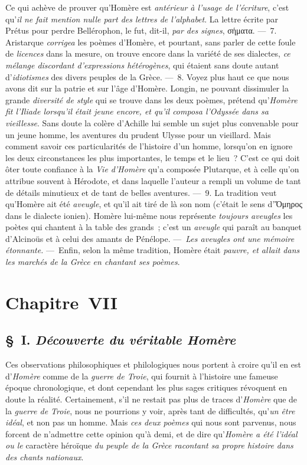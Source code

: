 \documentclass[french,twoside]{book} %
\newcommand\chapteropen{} %
\newcommand\chaptercont{} %
\newcommand\chapterclose{} %
\begin{document}
Ce qui achève de prouver qu’Homère est {\itshape antérieur à l’usage de l’écriture}, c’est qu’{\itshape il ne fait mention nulle part des lettres de l’alphabet}. La lettre écrite par Prétus pour perdre Bellérophon, le fut, dit-il, {\itshape par des signes}, σήματα. — 7. Aristarque {\itshape corrigea} les poèmes d’Homère, et pourtant, sans parler de  cette foule de {\itshape licences} dans la mesure, on trouve encore dans la variété de ses dialectes, {\itshape ce mélange discordant d’expressions hétérogènes}, qui étaient sans doute autant d’{\itshape idiotismes} des divers peuples de la Grèce. — 8. Voyez plus haut ce que nous avons dit sur la patrie et sur l’âge d’Homère. Longin, ne pouvant dissimuler la grande {\itshape diversité de style} qui se trouve dans les deux poèmes, prétend qu’{\itshape Homère fit l’Iliade lorsqu’il était jeune encore, et qu’il composa l’Odyssée dans sa vieillesse}. Sans doute la colère d’Achille lui semble un sujet plus convenable pour un jeune homme, les aventures du prudent Ulysse pour un vieillard. Mais comment savoir ces particularités de l’histoire d’un homme, lorsqu’on en ignore les deux circonstances les plus importantes, le temps et le lieu ? C’est ce qui doit ôter toute confiance à la {\itshape Vie d’Homère} qu’a composée Plutarque, et à celle qu’on attribue souvent à Hérodote, et dans laquelle l’auteur a rempli un volume de tant de détails minutieux et de tant de belles aventures. — 9. La tradition veut qu’Homère ait été {\itshape aveugle}, et qu’il ait tiré de là son nom (c’était le sens d’Ὅμηρος dans le dialecte ionien). Homère lui-même nous représente {\itshape toujours aveugles} les poètes qui chantent à la table des grands ; c’est un {\itshape aveugle} qui paraît au banquet d’Alcinoüs et à celui des amants de Pénélope. — {\itshape Les aveugles ont une mémoire étonnante.} — Enfin, selon la même tradition, Homère était {\itshape pauvre, et allait dans les marchés de la Grèce en chantant ses poèmes}.
\chapterclose


\chapteropen
\chapter[{Chapitre VII}]{Chapitre VII}

\chaptercont
\section[{§ I. Découverte du véritable Homère}]{§ I. {\itshape Découverte du véritable Homère}}
\noindent  Ces observations philosophiques et philologiques nous portent à croire qu’il en est d’{\itshape Homère} comme de la {\itshape guerre de Troie}, qui fournit à l’histoire une fameuse époque chronologique, et dont cependant les plus sages critiques révoquent en doute la réalité. Certainement, s’il ne restait pas plus de traces d’{\itshape Homère} que de la {\itshape guerre de Troie}, nous ne pourrions y voir, après tant de difficultés, qu’{\itshape un être idéal}, et non pas un homme. Mais {\itshape ces deux poèmes} qui nous sont parvenus, nous forcent de n’admettre cette opinion qu’à demi, et de dire qu’{\itshape Homère a été l’idéal ou le} caractère héroïque {\itshape du peuple de la Grèce racontant sa propre histoire dans des chants nationaux}.
\end{document}
